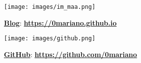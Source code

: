 \documentclass[a4paper]{article} %
\begin{document}
\begin{minipage}{0.05\textwidth}
    \texttt{[image: images/im\_maa.png]} 
\end{minipage}
\begin{minipage}{.7\textwidth}
    \vspace{1mm} %
    \href{https://0mariano.github.io}{\textbf{\color{black}Blog}}: \href{https://0mariano.github.io}{\textbf{\color{blue}https://0mariano.github.io}}
\end{minipage}

\begin{minipage}{0.05\textwidth}
    \texttt{[image: images/github.png]} 
\end{minipage}
\begin{minipage}{.7\textwidth}
    \vspace{1mm} %
    \href{https://github.com/0mariano}{\textbf{\color{black}GitHub}}: \href{https://github.com/0mariano}{\textbf{\color{blue}https://github.com/0mariano}}
\end{minipage}
\end{document}
